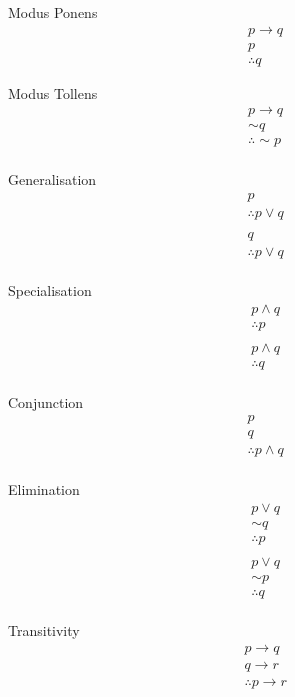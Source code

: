 \documentclass{article}
\begin{document}
Modus Ponens 
\begin{align*}
& p \rightarrow q \\ 
& p \\
& \therefore q
\end{align*}

Modus Tollens
\begin{align*}
& p \rightarrow q \\ 
& \sim q \\
& \therefore \sim p
\end{align*} \\

Generalisation
\begin{align*}
& p \\ 
& \therefore p \lor q \\ \\
& q \\ 
& \therefore p \lor q 
\end{align*} \\

Specialisation
\begin{align*}
& p \wedge q \\ 
& \therefore p \\ \\
& p \wedge q \\ 
& \therefore q 
\end{align*} \\

Conjunction
\begin{align*}
& p \\ 
& q \\
& \therefore p \wedge q
\end{align*} \\

Elimination
\begin{align*}
& p \lor q \\ 
& \sim q \\
& \therefore p \\ \\
& p \lor q \\ 
& \sim p \\
& \therefore q
\end{align*} \\

Transitivity
\begin{align*}
& p \rightarrow q \\ 
& q \rightarrow r \\
& \therefore p \rightarrow r
\end{align*} \\
\end{document}
